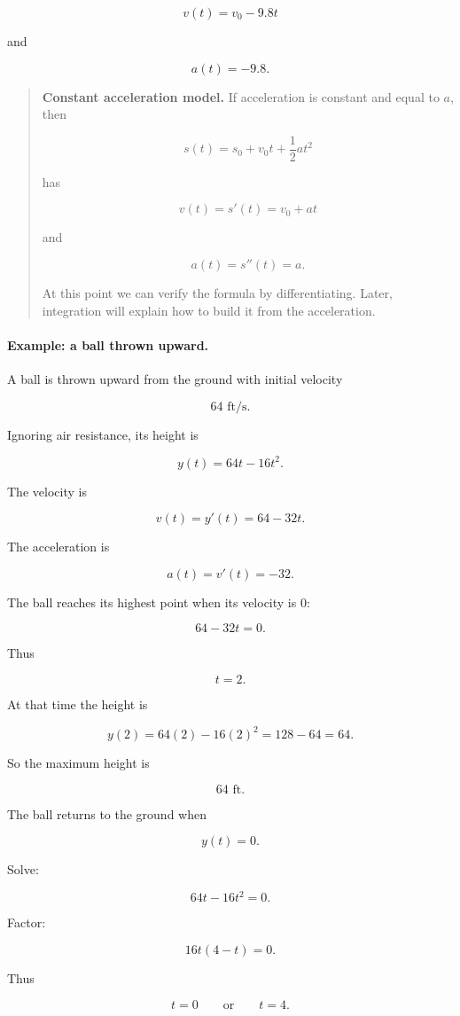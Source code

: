 \[
v(t)=v_0-9.8t
\]

and

\[
a(t)=-9.8.
\]

\begin{quote}
\textbf{Constant acceleration model.}
If acceleration is constant and equal to \(a\), then

\[
\boxed{s(t)=s_0+v_0t+\frac12at^2}
\]

has

\[
\boxed{v(t)=s'(t)=v_0+at}
\]

and

\[
\boxed{a(t)=s''(t)=a.}
\]

At this point we can verify the formula by differentiating.  Later, integration will explain how to build it from the acceleration.
\end{quote}

\paragraph{Example: a ball thrown upward.}
A ball is thrown upward from the ground with initial velocity

\[
64\text{ ft/s}.
\]

Ignoring air resistance, its height is

\[
y(t)=64t-16t^2.
\]

The velocity is

\[
v(t)=y'(t)=64-32t.
\]

The acceleration is

\[
a(t)=v'(t)=-32.
\]

The ball reaches its highest point when its velocity is \(0\):

\[
64-32t=0.
\]

Thus

\[
t=2.
\]

At that time the height is

\[
y(2)=64(2)-16(2)^2=128-64=64.
\]

So the maximum height is

\[
64\text{ ft}.
\]

The ball returns to the ground when

\[
y(t)=0.
\]

Solve:

\[
64t-16t^2=0.
\]

Factor:

\[
16t(4-t)=0.
\]

Thus

\[
t=0
\qquad\text{or}\qquad
t=4.
\]

